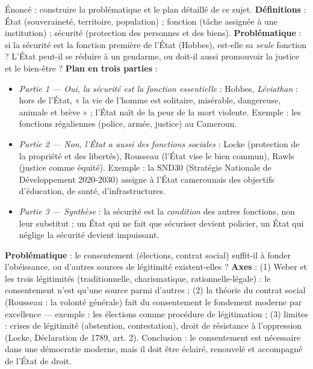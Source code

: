 \documentclass[11pt]{article}
\begin{document}
\begin{exoresolu}
Énoncé : construire la problématique et le plan détaillé de ce sujet.
\tcblower
\textbf{Définitions} : État (souveraineté, territoire, population) ; fonction (tâche assignée à une institution) ; sécurité (protection des personnes et des biens).
\textbf{Problématique} : si la sécurité est la fonction première de l'État (Hobbes), est-elle sa \emph{seule} fonction ? L'État peut-il se réduire à un gendarme, ou doit-il aussi promouvoir la justice et le bien-être ?
\textbf{Plan en trois parties} :
\begin{itemize}
\item \emph{Partie 1 — Oui, la sécurité est la fonction essentielle} : Hobbes, \emph{Léviathan} : hors de l'État, « la vie de l'homme est solitaire, misérable, dangereuse, animale et brève » ; l'État naît de la peur de la mort violente. Exemple : les fonctions régaliennes (police, armée, justice) au Cameroun.
\item \emph{Partie 2 — Non, l'État a aussi des fonctions sociales} : Locke (protection de la propriété et des libertés), Rousseau (l'État vise le bien commun), Rawls (justice comme équité). Exemple : la SND30 (Stratégie Nationale de Développement 2020-2030) assigne à l'État camerounais des objectifs d'éducation, de santé, d'infrastructures.
\item \emph{Partie 3 — Synthèse} : la sécurité est la \emph{condition} des autres fonctions, non leur substitut ; un État qui ne fait que sécuriser devient policier, un État qui néglige la sécurité devient impuissant.
\end{itemize}
\end{exoresolu}

\begin{exemplebox}
\textbf{Problématique} : le consentement (élections, contrat social) suffit-il à fonder l'obéissance, ou d'autres sources de légitimité existent-elles ?
\textbf{Axes} : (1) Weber et les trois légitimités (traditionnelle, charismatique, rationnelle-légale) : le consentement n'est qu'une source parmi d'autres ; (2) la théorie du contrat social (Rousseau : la volonté générale) fait du consentement le fondement moderne par excellence — exemple : les élections comme procédure de légitimation ; (3) limites : crises de légitimité (abstention, contestation), droit de résistance à l'oppression (Locke, Déclaration de 1789, art. 2). Conclusion : le consentement est nécessaire dans une démocratie moderne, mais il doit être éclairé, renouvelé et accompagné de l'État de droit.
\end{exemplebox}
\end{document}
